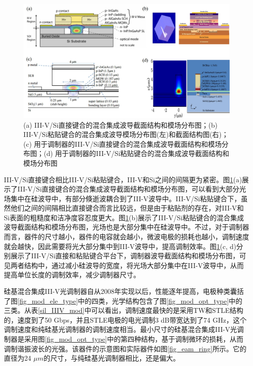 \begin{figure}[htb]
	\centering
	\includegraphics[width=12cm]{./Pictures/fig_hybrid_wg_cross.jpg}
	\caption{ (a) III-V/Si直接键合的混合集成波导截面结构和模场分布图\cite{fang2006electrically}；(b) III-V/Si粘贴键合的混合集成波导模场分布图(左)和截面结构图(右)\cite{stankovic2010evanescently}；(c) 用于调制器的III-V/Si直接键合的混合集成波导截面结构和模场分布图\cite{tang201150}；(d) 用于调制器的III-V/Si粘贴键合的混合集成波导截面结构和模场分布图}
	\label{fig_hybrid_wg_cross}
\end{figure}

III-V/Si直接键合相比III-V/Si粘贴键合，III-V和Si之间的间隔更为紧密。图\ref{fig_hybrid_wg_cross}(a)展示了III-V/Si直接键合的混合集成波导截面结构和模场分布图，可以看到大部分光场集中在硅波导中，有部分倏逝波耦合到了III-V波导中。III-V/Si粘贴键合下，虽然他们之间的间隔相比直接键合而言比较远，但是由于粘贴剂的存在，对III-V和Si表面的粗糙度和洁净度容忍度更大\cite{gunther2007}。图\ref{fig_hybrid_wg_cross}(b)展示了III-V/Si粘贴键合的混合集成波导截面结构和模场分布图，光场也是大部分集中在硅波导中。不过，对于调制器而言，器件的尺寸越小，器件的电容就会越小，微波电极的损耗也越小，调制速度就会越快，因此需要将光大部分集中到III-V波导中，提高调制效率。图\ref{fig_hybrid_wg_cross}(c, d)分别展示了III-V/Si直接和粘贴键合平台下，调制器波导截面结构和模场分布图，可见两者结构中，通过减小硅波导的宽度，将光场大部分集中在III-V波导中，从而提高单位长度的调制效率，减少调制器尺寸。

硅基混合集成III-V光调制器自从2008年实现以后，性能逐年提高，电极种类囊括了图\ref{fig_mod_ele_type}中的四类，光学结构包含了图\ref{fig_mod_opt_type}中的三类。从表\ref{sil_IIIV_mod}中可以看出，调制速度最快的是采用TW和STLE结构的，速度到了50 Gbps，并且STLE电极的电光调制3 dB带宽达到了74 GHz\cite{tang2012over}，这个调制速度和纯硅基光调制器的调制速度相当。最小尺寸的硅基混合集成III-V光调制器是采用图\ref{fig_mod_opt_type}中的第四种结构，基于调制微环的损耗，从而调制谐振波长的光强。该器件的示意图和实际器件如图\ref{fig_eam_ring}所示\cite{Srinivasan2012micro}。它的直径为24 $\mu m$的尺寸，与纯硅基光调制器相比，还是偏大。

